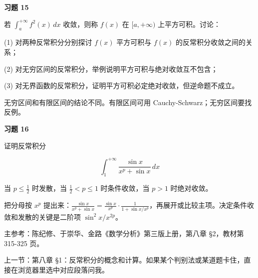 \begin{exercisebox}
\textbf{习题 15 }

若 \(\int_a^{+\infty}f^2(x)\,dx\) 收敛，则称 \(f(x)\) 在 \([a,+\infty)\) 上平方可积。讨论：

(1) 对两种反常积分分别探讨 \(f(x)\) 平方可积与 \(f(x)\) 的反常积分收敛之间的关系；

(2) 对无穷区间的反常积分，举例说明平方可积与绝对收敛互不包含；

(3) 对无界函数的反常积分，证明平方可积必定绝对收敛，但逆命题不成立。

\begin{hintbox}
无穷区间和有限区间的结论不同。有限区间可用 Cauchy-Schwarz；无穷区间要找反例。
\end{hintbox}
\end{exercisebox}

\begin{exercisebox}
\textbf{习题 16 }

证明反常积分

\[
        \int_1^{+\infty}\frac{\sin x}{x^p+\sin x}\,dx
      \]

当 \(p\le\frac12\) 时发散，当 \(\frac12<p\le1\) 时条件收敛，当 \(p>1\) 时绝对收敛。

\begin{hintbox}
把分母按 \(x^p\) 提出来：\(\frac{\sin x}{x^p+\sin x}=\frac{\sin x}{x^p}\cdot\frac{1}{1+\sin x/x^p}\)，再展开或比较主项。决定条件收敛和发散的关键是二阶项 \(\sin^2x/x^{2p}\)。
\end{hintbox}
\end{exercisebox}

主参考：陈纪修、于崇华、金路《数学分析》第三版上册，第八章 §2，教材第 315-325 页。

上一节：第八章 §1：反常积分的概念和计算。如果某个判别法或某道题卡住，直接在浏览器里选中对应段落问我。
